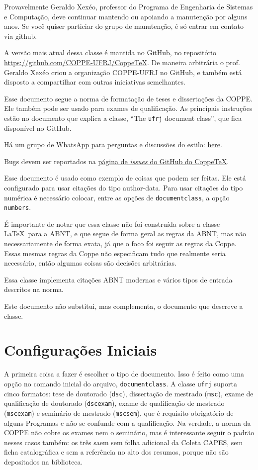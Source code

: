 \documentclass[dsc,setavermelha,numeracaoporcapitulo,linhanafolhaderosto]{ufrj}
\theoremstyle{plain}
\theoremstyle{definition}
\theoremstyle{remark}
\begin{document}
   Provavelmente Geraldo Xexéo, professor do Programa de Engenharia de Sistemas e Computação, deve continuar mantendo ou apoiando a manutenção por alguns anos. Se você quiser particiar do grupo de manutenção, é só entrar em contato via github.

  A versão mais atual dessa classe é mantida no GitHub, no repositório \url{https://github.com/COPPE-UFRJ/CoppeTeX}. De maneira arbitrária o prof. Geraldo Xexéo criou a organização COPPE-UFRJ no GitHub, e também está disposto a compartilhar com outras iniciativas semelhantes.

  Esse documento segue a norma de formatação de teses e dissertações da COPPE. Ele também pode ser usado para exames de qualificação. As principais instruções estão no documento que explica a classe, ``The \verb|ufrj| document class'', que fica disponível no GitHub.

  Há um grupo de WhatsApp para perguntas e discussões do estilo: \href{https://github.com/COPPE-UFRJ/CoppeTeX/wiki}{here}.

  Bugs devem ser reportados na \href{https://github.com/COPPE-UFRJ/CoppeTeX/issues}{página de \textit{issues} do GitHub do CoppeTeX}.

  Esse documento é usado como exemplo de coisas que podem ser feitas. Ele está configurado para usar citações do tipo author-data. Para usar citações do tipo numérica é necessário colocar, entre as opções de \verb|documentclass|, a opção \verb|numbers|.

  É importante de notar que essa classe não foi construída sobre a classe \LaTeX \  para a ABNT, e que segue de forma geral as regras da ABNT, mas não necessariamente de forma exata, já que o foco foi seguir as regras da Coppe. Essas mesmas regras da Coppe não especificam tudo que realmente seria necessário, então algumas coisas são decisões arbitrárias.

  Essa classe implementa citações ABNT modernas e vários tipos de entrada descritos na norma.

  Este documento não substitui, mas complementa, o documento que descreve a classe.

\chapter{Configurações Iniciais}

   A primeira coisa a fazer é escolher o tipo de documento. Isso é feito como uma opção no comando inicial do arquivo, \verb|documentclass|. A classe \verb|ufrj| suporta cinco formatos: tese de doutorado (\verb|dsc|), dissertação de mestrado (\verb|msc|), exame de qualificação de doutorado (\verb|dscexam|), exame de qualificação de mestrado (\verb|mscexam|) e seminário de mestrado (\verb|mscsem|), que é requisito obrigatório de alguns Programas e não se confunde com a qualificação. Na verdade, a norma da COPPE não cobre os exames nem o seminário, mas é interessante seguir o padrão nesses casos também: os três saem sem folha adicional da Coleta CAPES, sem ficha catalográfica e sem a referência no alto dos resumos, porque não são depositados na biblioteca.
\end{document}
